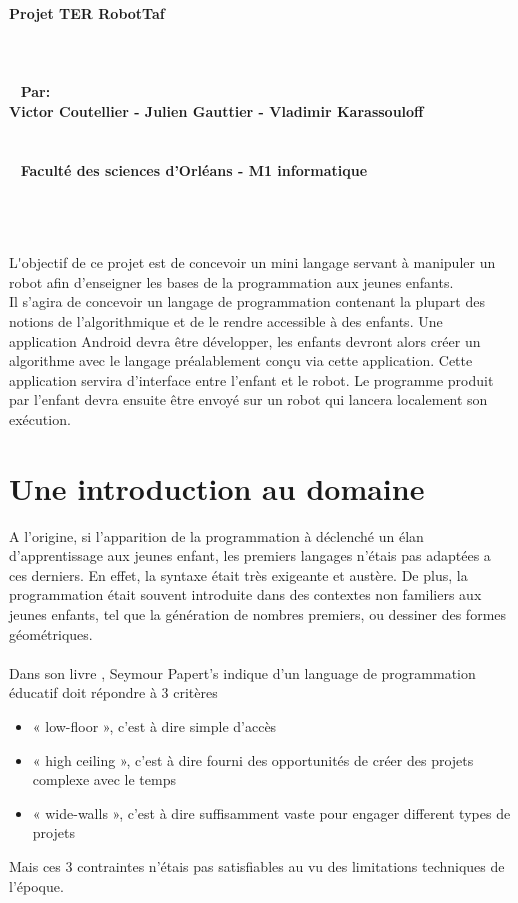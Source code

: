 \documentclass[a4paper]{article}
\begin{document}
\begin{center}
{\Huge \textbf{Projet TER RobotTaf}}
\\~
\\~
\\~
\\~
{\Large \textbf{Par:}}\\
\large{\textbf{Victor Coutellier - Julien Gauttier - Vladimir Karassouloff}}
\\~
\\~
\\~
\large{\textbf{Faculté des sciences d’Orléans -  M1 informatique}}
\\~
\\~
\\~
\end{center}

\tableofcontents
\newpage

\lettrine{L}'objectif de ce projet est de concevoir un mini langage servant à manipuler un robot afin d’enseigner les bases de la programmation aux jeunes enfants.
\\
Il s’agira de concevoir un langage de programmation contenant la plupart des notions de l’algorithmique et de le rendre accessible à des enfants. Une application Android devra être développer, les enfants devront alors créer un algorithme avec le langage préalablement conçu via cette application. Cette application servira d’interface entre l’enfant et le robot. Le programme produit par l’enfant devra ensuite être envoyé sur un robot qui lancera localement son exécution.

\section{Une introduction au domaine}

A l’origine, si l’apparition de la programmation à déclenché un élan d’apprentissage aux jeunes enfant, les premiers langages n’étais pas adaptées a ces derniers. En effet, la syntaxe était très exigeante et austère. De plus, la programmation était souvent introduite dans des contextes non familiers aux jeunes enfants, tel que la génération de nombres premiers, ou dessiner des formes géométriques.

\paragraph{}
Dans son livre \cite{Papert:1980:MCC:1095592}, Seymour Papert’s indique d’un language de programmation éducatif doit répondre à 3 critères
\begin{itemize}
\item « low-floor », c’est à dire simple d’accès
\item « high ceiling », c’est à dire fourni des opportunités de créer des projets complexe avec le temps
\item « wide-walls », c’est à dire suffisamment vaste pour engager different types de projets
\end{itemize}
Mais ces 3 contraintes n’étais pas satisfiables au vu des limitations techniques de l’époque.
\end{document}
